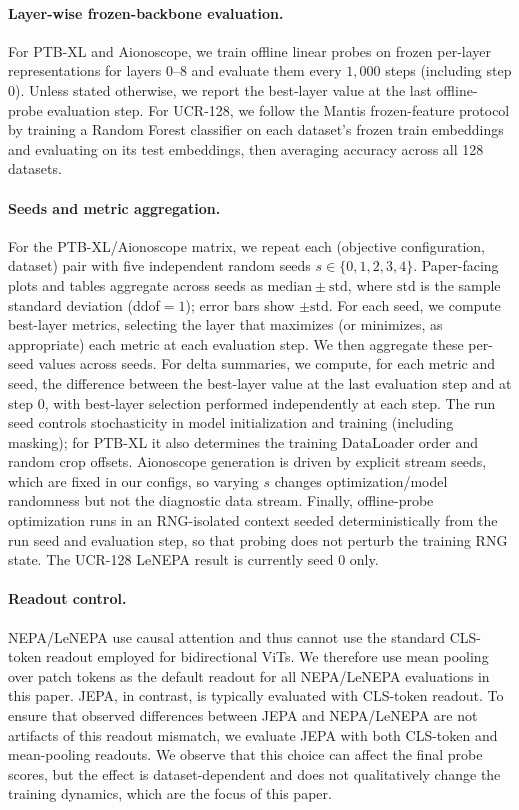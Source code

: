 \paragraph{Layer-wise frozen-backbone evaluation.}
For PTB-XL and Aionoscope, we train offline linear probes on frozen per-layer representations for layers $0$--$8$ and evaluate them every $1{,}000$ steps (including step $0$).
Unless stated otherwise, we report the best-layer value at the last offline-probe evaluation step.
For UCR-128, we follow the Mantis frozen-feature protocol by training a Random Forest classifier on each dataset's frozen train embeddings and evaluating on its test embeddings, then averaging accuracy across all 128 datasets.

\paragraph{Seeds and metric aggregation.}
For the PTB-XL/Aionoscope matrix, we repeat each (objective configuration, dataset) pair with five independent random seeds $s\in\{0,1,2,3,4\}$.
Paper-facing plots and tables aggregate across seeds as $\mathrm{median}\pm\mathrm{std}$, where $\mathrm{std}$ is the sample standard deviation (ddof$=1$); error bars show $\pm\mathrm{std}$.
For each seed, we compute best-layer metrics, selecting the layer that maximizes (or minimizes, as appropriate) each metric at each evaluation step.
We then aggregate these per-seed values across seeds.
For delta summaries, we compute, for each metric and seed, the difference between the best-layer value at the last evaluation step and at step $0$, with best-layer selection performed independently at each step.
The run seed controls stochasticity in model initialization and training (including masking); for PTB-XL it also determines the training DataLoader order and random crop offsets.
Aionoscope generation is driven by explicit stream seeds, which are fixed in our configs, so varying $s$ changes optimization/model randomness but not the diagnostic data stream.
Finally, offline-probe optimization runs in an RNG-isolated context seeded deterministically from the run seed and evaluation step, so that probing does not perturb the training RNG state.
The UCR-128 LeNEPA result is currently seed $0$ only.

\paragraph{Readout control.}
NEPA/LeNEPA use causal attention and thus cannot use the standard CLS-token readout employed for bidirectional ViTs. We therefore use mean pooling over patch tokens as the default readout for all NEPA/LeNEPA evaluations in this paper.
JEPA, in contrast, is typically evaluated with CLS-token readout.
To ensure that observed differences between JEPA and NEPA/LeNEPA are not artifacts of this readout mismatch, we evaluate JEPA with both CLS-token and mean-pooling readouts.
We observe that this choice can affect the final probe scores, but the effect is dataset-dependent and does not qualitatively change the training dynamics, which are the focus of this paper.


